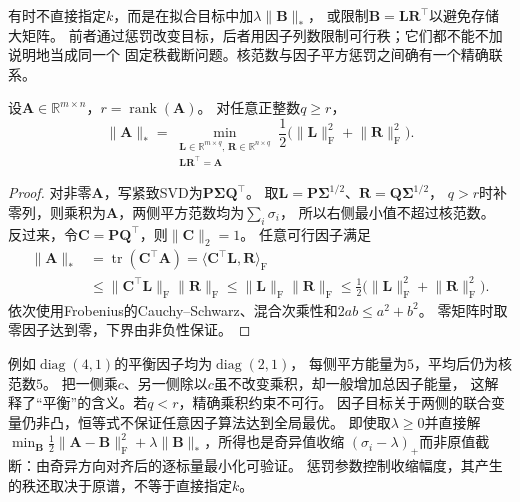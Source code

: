 有时不直接指定$k$，而是在拟合目标中加$\lambda\lVert\bm B\rVert_*$，
或限制$\bm B=\bm L\bm R^\top$以避免存储大矩阵。
前者通过惩罚改变目标，后者用因子列数限制可行秩；它们都不能不加说明地当成同一个
固定秩截断问题。核范数与因子平方惩罚之间确有一个精确联系。
\begin{lemma}[核范数的因子分解表达]
\label{lem:matrix-analysis-nuclear-factorization}
设$\bm A\in\mathbb R^{m\times n}$，$r=\operatorname{rank}(\bm A)$。
对任意正整数$q\geq r$，
\begin{equation}
 \lVert\bm A\rVert_*
 =\min_{\substack{\bm L\in\mathbb R^{m\times q},\,
                  \bm R\in\mathbb R^{n\times q}\\\bm L\bm R^\top=\bm A}}
   \frac12\bigl(\lVert\bm L\rVert_{\mathrm F}^2+\lVert\bm R\rVert_{\mathrm F}^2\bigr).
 \label{eq:matrix-analysis-nuclear-factorization}
\end{equation}
\end{lemma}
\begin{proof}
对非零$\bm A$，写紧致SVD为$\bm P\bm\Sigma\bm Q^\top$。
取$\bm L=\bm P\bm\Sigma^{1/2}$、$\bm R=\bm Q\bm\Sigma^{1/2}$，
$q>r$时补零列，则乘积为$\bm A$，两侧平方范数均为$\sum_i\sigma_i$，
所以右侧最小值不超过核范数。
反过来，令$\bm C=\bm P\bm Q^\top$，则$\lVert\bm C\rVert_2=1$。
任意可行因子满足
\[
 \begin{aligned}
 \lVert\bm A\rVert_*
 &=\operatorname{tr}(\bm C^\top\bm A)
   =\langle\bm C^\top\bm L,\bm R\rangle_{\mathrm F}\\
 &\leq\lVert\bm C^\top\bm L\rVert_{\mathrm F}\lVert\bm R\rVert_{\mathrm F}
 \leq\lVert\bm L\rVert_{\mathrm F}\lVert\bm R\rVert_{\mathrm F}
 \leq\tfrac12\bigl(\lVert\bm L\rVert_{\mathrm F}^2+
                   \lVert\bm R\rVert_{\mathrm F}^2\bigr).
 \end{aligned}
\]
依次使用Frobenius的Cauchy--Schwarz、混合次乘性和$2ab\leq a^2+b^2$。
零矩阵时取零因子达到零，下界由非负性保证。
\end{proof}

例如$\operatorname{diag}(4,1)$的平衡因子均为$\operatorname{diag}(2,1)$，
每侧平方能量为$5$，平均后仍为核范数$5$。
把一侧乘$c$、另一侧除以$c$虽不改变乘积，却一般增加总因子能量，
这解释了“平衡”的含义。若$q<r$，精确乘积约束不可行。
因子目标关于两侧的联合变量仍非凸，恒等式不保证任意因子算法达到全局最优。
即使取$\lambda\geq0$并直接解
$\min_{\bm B}\tfrac12\lVert\bm A-\bm B\rVert_{\mathrm F}^2
+\lambda\lVert\bm B\rVert_*$，所得也是奇异值收缩
$(\sigma_i-\lambda)_+$而非原值截断：由奇异方向对齐后的逐标量最小化可验证。
惩罚参数控制收缩幅度，其产生的秩还取决于原谱，不等于直接指定$k$。


